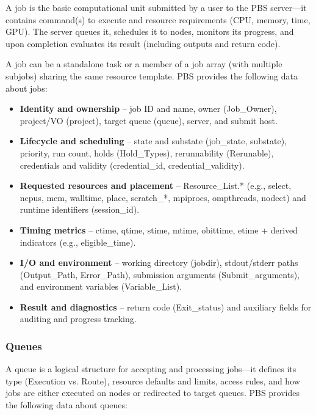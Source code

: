 \documentclass[
  digital,     %
  oneside,     %
  nosansbold,  %
  nocolorbold, %
  lof,         %
  lot,         %
]{fithesis4}
\begin{document}
A job is the basic computational unit submitted by a user to the PBS server---it contains command(s) to execute and resource requirements (CPU, memory, time, GPU). The server queues it, schedules it to nodes, monitors its progress, and upon completion evaluates its result (including outputs and return code).

A job can be a standalone task or a member of a job array (with multiple subjobs) sharing the same resource template. PBS provides the following data about jobs:

\begin{itemize}
  \item \textbf{Identity and ownership} -- job ID and name, owner (Job\_Owner), project/VO (project), target queue (queue), server, and submit host.
  
  \item \textbf{Lifecycle and scheduling} -- state and substate (job\_state, substate), priority, run count, holds (Hold\_Types), rerunnability (Rerunable), credentials and validity (credential\_id, credential\_validity).
  
  \item \textbf{Requested resources and placement} -- Resource\_List.* (e.g., select, ncpus, mem, walltime, place, scratch\_*, mpiprocs, ompthreads, nodect) and runtime identifiers (session\_id).
  
  \item \textbf{Timing metrics} -- ctime, qtime, stime, mtime, obittime, etime + derived indicators (e.g., eligible\_time).
  
  \item \textbf{I/O and environment} -- working directory (jobdir), stdout/stderr paths (Output\_Path, Error\_Path), submission arguments (Submit\_arguments), and environment variables (Variable\_List).
  
  \item \textbf{Result and diagnostics} -- return code (Exit\_status) and auxiliary fields for auditing and progress tracking.
\end{itemize}

\subsubsection{Queues}
\label{subsubsec:queues}

A queue is a logical structure for accepting and processing jobs---it defines its type (Execution vs. Route), resource defaults and limits, access rules, and how jobs are either executed on nodes or redirected to target queues. PBS provides the following data about queues:
\end{document}
